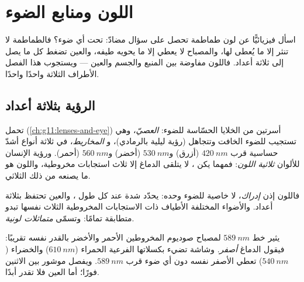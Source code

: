 \chapter{اللون ومنابع الضوء}\label{ch:g11:color-light-sources}

اسأل فيزيائيًّا عن لون طماطمة تحصل على سؤال مضادّ:
تحت أي ضوء؟ فالطماطمة لا تنثر إلا ما يُعطى لها، والمصباح
لا يعطي إلا ما يحويه طيفه، والعين تضغط كل ما يصل
إلى ثلاثة أعداد. فاللون مفاوضة بين المنبع
والجسم والعين --- ويستجوب هذا الفصل الأطراف الثلاثة واحدًا واحدًا.

\section{الرؤية بثلاثة أعداد}

\begin{definition}\label{def:g11:color-light-sources:cones}
تحمل  (\cref{ch:g11:lenses-and-eye}) أسرتين من الخلايا
الحسّاسة للضوء: \emph{العصيّ}، وهي تستجيب
للضوء الخافت وتتجاهل  (رؤية ليلية بالرمادي)، و
\emph{المخاريط}، في ثلاثة أنواع أشدّ حساسية قرب
$\qty{420}{nm}$ (أزرق) و$\qty{530}{nm}$ (أخضر) و$\qty{560}{nm}$
(أحمر). ورؤية الإنسان للألوان
\emph{ثلاثية اللون}: فمهما يكن ،
لا يتلقى الدماغ إلا ثلاث استجابات مخروطية، واللون هو ما
يصنعه من ذلك الثلاثي.
\end{definition}

\begin{definition}\label{def:g11:color-light-sources:perception}
فاللون إذن \emph{إدراك}، لا خاصية للضوء وحده:
 يحدّد شدة عند كل طول ، والعين تحتفظ
بثلاثة أعداد. والأضواء المختلفة الأطياف ذات الاستجابات المخروطية الثلاث
نفسها تبدو متطابقة تمامًا: وتسمّى \emph{متماثلات لونية}.
\end{definition}

\begin{example}[أصفران]\label{ex:g11:color-light-sources:yellows}
يثير خط $\qty{589}{nm}$ لمصباح صوديوم المخروطين الأحمر والأخضر
بالقدر نفسه تقريبًا: فيقول الدماغ \emph{أصفر}. وشاشة تضيء
بكسلاتها الفرعية الحمراء ($\qty{610}{nm}$) والخضراء ($\qty{540}{nm}$) تعطي
الأصفر نفسه دون أي ضوء قرب $\qty{589}{nm}$. ويفصل موشور
بين الاثنين فورًا؛ أما العين فلا تقدر أبدًا.
\end{example}

